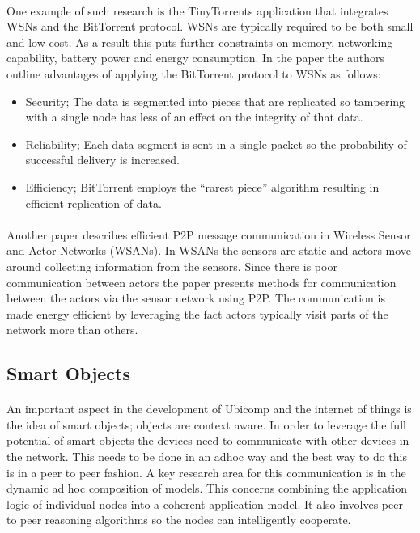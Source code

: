 \documentclass[11pt]{amsart}
\begin{document}
\paragraph{}
One example of such research is the TinyTorrents\cite{TinyTorrents} application that integrates WSNs and the BitTorrent protocol. WSNs are typically required to be both small and low cost. As a result this puts further constraints on memory, networking capability, battery power and energy consumption. In the paper the authors outline advantages of applying the BitTorrent protocol to WSNs as follows:
\begin{itemize}
  \item Security; The data is segmented into pieces that are replicated so tampering with a single node has less of an effect on the integrity of that data. 
  \item Reliability; Each data segment is sent in a single packet so the probability of successful delivery is increased.
  \item Efficiency; BitTorrent employs the ``rarest piece'' algorithm resulting in efficient replication of data.
\end{itemize}
\paragraph{}
Another paper describes efficient P2P message communication in Wireless Sensor and Actor Networks (WSANs). In WSANs the sensors are static and actors move around collecting information from the sensors. Since there is poor communication between actors the paper presents methods for communication between the actors via the sensor network using P2P. The communication is made energy efficient by leveraging the fact actors typically visit parts of the network more than others.\cite{EMD}
\subsection{Smart Objects}
\paragraph{}
An important aspect in the development of Ubicomp and the internet of things is the idea of smart objects; objects are context aware. In order to leverage the full potential of smart objects the devices need to communicate with other devices in the network. This needs to be done in an adhoc way and the best way to do this is in a peer to peer fashion. A key research area for this communication is in the dynamic ad hoc composition of models. This concerns combining the application logic of individual nodes into a coherent application model. It also involves peer to peer reasoning algorithms so the nodes can intelligently cooperate.\cite{kortuem2010smart}
\end{document}
